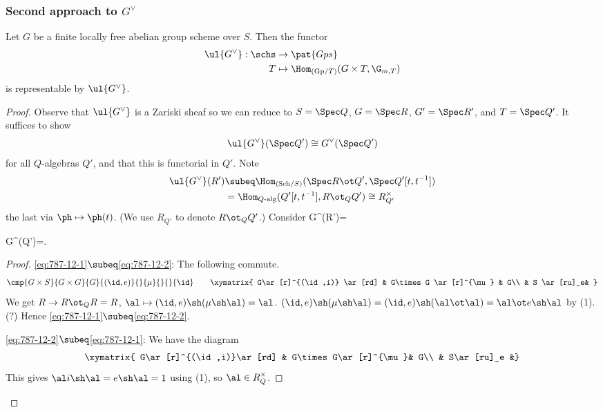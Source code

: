 \subsubsection{Second approach to $G^{\vee}$}
\begin{thm}
Let $G$ be a finite locally free abelian group scheme over $S$. Then the functor
\begin{align*}
\ul{G^{\vee}}:\schs &\to \pat{Gps}\\
T&\mapsto \Hom_{(\text{Gp}/T)} (G\times T, \G_{m,T})
\end{align*}
is representable by $\ul{G^{\vee}}$.
\end{thm}
\begin{proof}
Observe  that $\ul{G^{\vee}}$ is a Zariski sheaf %
so we can reduce to $S=\Spec Q$, $G=\Spec R$, $G'=\Spec R'$, and $T=\Spec Q'$. It suffices to show 
\[
\ul{G^{\vee}}(\Spec Q')\cong G^{\vee}(\Spec Q')
\]
for all $Q$-algebras $Q'$, and that this is functorial in $Q'$. Note 
\begin{align*}
\ul{G^{\vee}}(R')&\subeq \Hom_{(\text{Sch}/S)} (\Spec R\ot Q', \Spec Q'[t,t^{-1}])\\
&=\Hom_{Q\text{-alg}}(Q'[t,t^{-1}], R\ot_{Q}Q') \cong R_{Q'}^{\times}
\end{align*}
the last via $\ph\mapsto \ph(t)$. (We use $R_{Q'}$ to denote $R\ot_Q Q'$.)
Consider
G^{\vee}(R')=
\eeq
\begin{clm}
G^{\vee}(Q')=.
\eeq
\end{clm}
\begin{proof}
\eqref{eq:787-12-1}$\subeq $\eqref{eq:787-12-2}: The following commute.
\[
\cmp{G\times S}{G\times G}{G}{(\id,e)}{}{\mu}{}{}{\id}
\qquad
\xymatrix{
G\ar[r]^{(\id,i)} \ar[rd] & G\times G \ar[r]^{\mu} & G\\
& S \ar[ru]_e&
}
\]
We get $R\to R\ot_Q R= R$, $\al\mapsto (\id,e)\sh (\mu\sh \al)=\al$. $(\id,e)\sh (\mu\sh \al)=(\id,e)\sh (\al \ot \al)=\al \ot e\sh \al$ by (1).(?) Hence \eqref{eq:787-12-1}$\subeq $\eqref{eq:787-12-2}.

\eqref{eq:787-12-2}$\subeq $\eqref{eq:787-12-1}: We have the diagram
\[
\xymatrix{
G\ar[r]^{(\id,i)}\ar[rd] & G\times G\ar[r]^{\mu}& G\\
& S\ar[ru]_e &}
\]
This gives $\al i\sh \al = e\sh \al=1 $ using (1), so $\al\in R_Q^{\times}$.
\end{proof}
\end{proof}